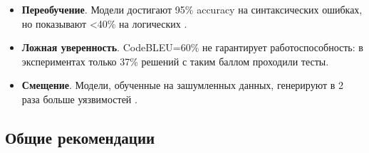 \documentclass[14pt]{article}
\theoremstyle{definition}
\begin{document}
\begin{itemize}
    \item \textbf{Переобучение}. Модели достигают 95\% accuracy на синтаксических ошибках, но показывают <40\% на логических \cite{austin2021program}. 
    \item \textbf{Ложная уверенность}. CodeBLEU=60\% не гарантирует работоспособность: в экспериментах \cite{wan2023codet5+} только 37\% решений с таким баллом проходили тесты.
    \item \textbf{Смещение}. Модели, обученные на зашумленных данных, генерируют в 2 раза больше уязвимостей \cite{copilot}.
\end{itemize}


\subsection{Общие рекомендации}
\end{document}
